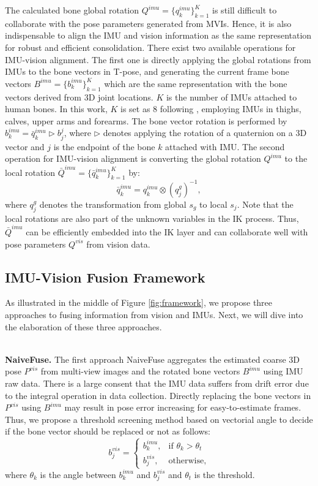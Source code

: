 \documentclass[lettersize,journal]{IEEEtran}
\begin{document}
The calculated bone global rotation $Q^{imu} = \lbrace q_{k}^{imu} \rbrace_{k=1}^{K}$ is still difficult to collaborate with the pose parameters generated from MVIs. Hence, it is also indispensable to align the IMU and vision information as the same representation for robust and efficient consolidation. There exist two available operations for IMU-vision alignment. The first one is directly applying the global rotations from IMUs to the bone vectors in T-pose, and generating the current frame bone vectors $B^{imu} = \lbrace b_{k}^{imu} \rbrace_{k=1}^{K}$ which are the same representation with the bone vectors derived from 3D joint locations. $K$ is the number of IMUs attached to human bones. In this work, $K$ is set as 8 following \cite{zhang2020fusing}, employing IMUs in thighs, calves, upper arms and forearms. The bone vector rotation is performed by $b^{imu}_{k} = \bar{q}_{k}^{imu} \rhd b_{j}^{j}$, where $\rhd$ denotes applying the rotation of a quaternion on a 3D vector and $j$ is the endpoint of the bone $k$ attached with IMU. The second operation for IMU-vision alignment is converting the global rotation $Q^{imu}$ to the local rotation $\bar{Q}^{imu} = \lbrace \bar{q}_{k}^{imu} \rbrace_{k=1}^{K}$ by:
\begin{equation}
\bar{q}_{k}^{imu} = q_{k}^{imu} \otimes (q_{j}^{g})^{-1},
\end{equation}
where $q_{j}^{g}$ denotes the transformation from global $s_{g}$ to local $s_j$. Note that the local rotations are also part of the unknown variables in the IK process. Thus, $\bar{Q}^{imu}$ can be efficiently embedded into the IK layer and can collaborate well with pose parameters $Q^{vis}$ from vision data.

\subsection{IMU-Vision Fusion Framework}
\label{subsec:fusion}

As illustrated in the middle of Figure \ref{fig:framework}, we propose three approaches to fusing information from vision and IMUs. Next, we will dive into the elaboration of these three approaches.

~\\
\noindent \textbf{NaiveFuse.}
\quad The first approach NaiveFuse aggregates the estimated coarse 3D pose $P^{vis}$ from multi-view images and the rotated bone vectors $B^{imu}$ using IMU raw data. There is a large consent that the IMU data suffers from drift error due to the integral operation in data collection. Directly replacing the bone vectors in $P^{vis}$ using $B^{imu}$ may result in pose error increasing for easy-to-estimate frames. Thus, we propose a threshold screening method based on vectorial angle to decide if the bone vector should be replaced or not as follows:
\begin{equation}
b^{vis}_{j} = \begin{cases}
   b^{imu}_{k}, &\text{if } \theta_{k} > \theta_{t} \\
   b^{vis}_{j}, &\text{otherwise},
\end{cases}
\end{equation}
where $\theta_{k}$ is the angle between $b^{imu}_{k}$ and  $b_{j}^{vis}$ and $\theta_{t}$ is the threshold.
\end{document}
